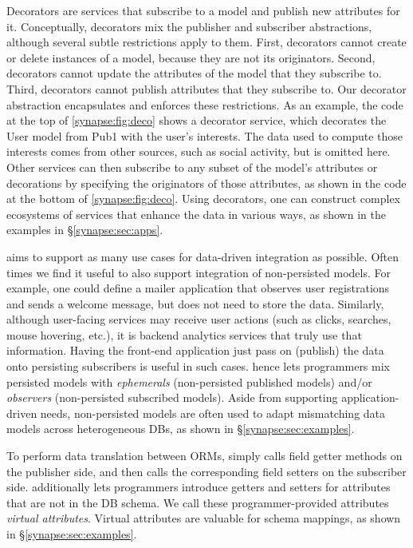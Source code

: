 Decorators are services that subscribe to a
model and publish new attributes for it.  Conceptually, decorators mix the
publisher and subscriber abstractions, although several subtle restrictions apply to them.  
First, decorators cannot create or delete instances
of a model, because they are not its originators.  Second,
decorators cannot update the attributes of the model that they subscribe
to.  Third, decorators cannot publish attributes that they subscribe to.
Our decorator \mbox{abstraction} encapsulates and enforces these 
restrictions.
As an example, the code at the top of \F\ref{synapse:fig:deco} shows a decorator
service, which decorates the User model from Pub1 with the user's interests.
The data used to compute those interests comes from other sources,
such as social activity, but is omitted here. Other services can then subscribe
to any subset of the model's attributes or decorations by specifying the
originators of those attributes, as shown in the code at the bottom of \F\ref{synapse:fig:deco}.
Using decorators, one can construct complex ecosystems of services
that enhance the data in various ways, as shown in the examples in
\S\ref{synapse:sec:apps}.

 \synapse aims to support as many use cases
for data-driven integration as possible.  Often times we find it useful to
also support integration of non-persisted models.
For example, one could define a mailer application that observes user
registrations and sends a welcome message, but does not need to store the data.
Similarly, although user-facing services may receive user actions
(such as clicks, searches, mouse hovering, etc.), it is backend analytics
services that truly use that information.  Having the front-end application just
pass on (publish) the data onto persisting subscribers is useful in such cases.
\synapse hence lets programmers mix persisted models with {\em ephemerals}
(non-persisted published models)
and/or {\em observers} (non-persisted subscribed models).  Aside from
supporting application-driven needs, non-persisted models are often used to
adapt mismatching data models across heterogeneous DBs, as shown in
\S\ref{synapse:sec:examples}.

 To perform data translation between ORMs,
\synapse simply calls field getter methods on the publisher side, and then
calls the corresponding field setters on the subscriber side. \synapse
additionally lets programmers introduce getters and setters for attributes
that are not in the DB schema.  We call these programmer-provided attributes
{\em virtual attributes}. Virtual attributes are valuable for schema mappings,
as shown in \S\ref{synapse:sec:examples}.


